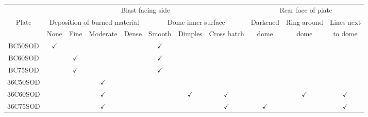 \begin{table*}[!h]\centering
	\begin{tabular}{|c|  c  c  c  c  c   c  c | c  c  c| }
		\toprule
		          & \multicolumn{7}{|c|}{Blast facing side}            & \multicolumn{3}{c|}{Rear face of plate}                                                                                                                        \\
		Plate     & \multicolumn{4}{|c}{Deposition of burned material} & \multicolumn{3}{c|}{Dome inner surface} & Darkened     & Ring around & Lines next                                                                              \\
		          & None                                               & Fine                                    & Moderate     & Dense       & Smooth       & Dimples      & Cross hatch  & dome         & dome         & to dome      \\
		\midrule
		BC50SOD   & $\checkmark$                                       &                                         &              &             & $\checkmark$ &              &              &              &              &              \\
		BC60SOD   &                                                    & $\checkmark$                            &              &             & $\checkmark$ &              &              &              &              &              \\
		BC75SOD   &                                                    & $\checkmark$                            &              &             & $\checkmark$ &              &              &              &              &              \\
		36C50SOD  &                                                    &                                         & $\checkmark$ &             &              &              &              &              &              &              \\
		36C60SOD  &                                                    &                                         & $\checkmark$ &             &              & $\checkmark$ & $\checkmark$ &              & $\checkmark$ & $\checkmark$ \\
		36C75SOD  &                                                    &                                         & $\checkmark$ &             &              &              & $\checkmark$ & $\checkmark$ &              & $\checkmark$ \\

\end{tabular}
\end{table*}
